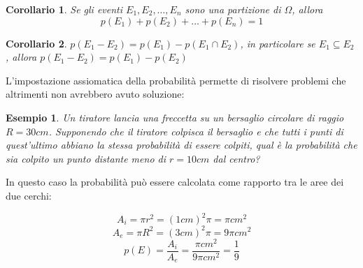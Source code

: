 \documentclass{article}     %
\newtheorem{ex}{Esempio}[section]
\newtheorem{corollary}{Corollario}
\begin{document}
                    \begin{corollary}
                        Se gli eventi $E_1,E_2,\dots,E_n$ sono una partizione di $\Omega$, allora\[p(E_1)+p(E_2)+\dots+p(E_n)=1\]
                    \end{corollary}
                    \begin{corollary}
                        $p(E_1-E_2)=p(E_1)-p(E_1\cap E_2)$, in particolare se $E_1 \subseteq E_2$ , allora $p(E_1-E_2)=p(E_1)-p(E_2)$
                    \end{corollary}
                    L'impostazione assiomatica della probabilità permette di risolvere problemi che altrimenti non avrebbero avuto soluzione:
                    \begin{ex}
                        Un tiratore lancia una freccetta su un bersaglio circolare di raggio $R=30cm$. Supponendo che il tiratore colpisca il bersaglio e che tutti i punti di quest'ultimo abbiano la stessa probabilità di essere colpiti, qual è la probabilità che sia colpito un punto distante meno di $r=10cm$ dal centro?
                    \end{ex}
                    In questo caso la probabilità può essere calcolata come rapporto tra le aree dei due cerchi:
                    \begin{center}
                        
                    \end{center}
                    \[A_i=\pi r^2=(1cm)^2\pi=\pi cm^2\]
                    \[A_e=\pi R^2=(3cm)^2\pi=9\pi cm^2\]
                    \[p(E)=\frac{A_i}{A_e}=\frac{\pi cm^2}{9\pi cm^2}=\frac{1}{9}\]
                        
                    
 
\end{document}
